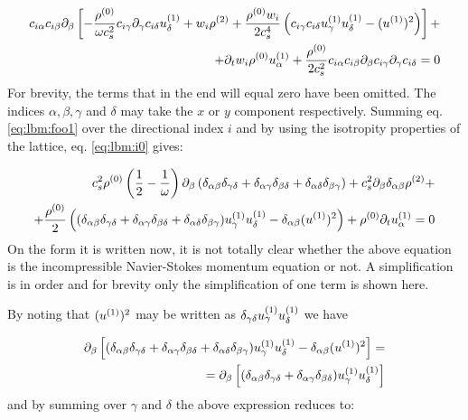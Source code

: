 \begin{equation}\label{eq:lbm:foo1}
\begin{aligned}
c_{i\alpha}c_{i\beta}\partial_{\beta} \left[ - \frac{\rho^{(0)}}{\omega
    c_s^2} c_{i\gamma}\partial_{\gamma}c_{i\delta} u_{\delta}^{(1)} +
  w_i\rho^{(2)} +
  \frac{\rho^{(0)}w_i}{2c_s^4}\left(c_{i\gamma}c_{i\delta}u_{\gamma}^{(1)}u_{\delta}^{(1)}
  - (u_{}^{(1)})^2 \right) \right] + \\ + \partial_tw_i\rho^{(0)}u_{\alpha}^{(1)} +
\frac{\rho^{(0)}}{2 c_s^2}
c_{i\alpha}c_{i\beta}\partial_{\beta}c_{i\gamma}\partial_{\gamma}c_{i\delta}
= 0
\end{aligned}
\end{equation}
For brevity, the terms that in the end will equal zero have been
omitted. The indices $\alpha, \beta, \gamma$ and $\delta$ may take the
$x$ or $y$ component respectively. Summing eq. \eqref{eq:lbm:foo1}
over the directional index $i$ and by using the isotropity properties
of the lattice, eq. \eqref{eq:lbm:i0} gives:

\begin{equation}\label{eq:lbm:dino}
\begin{aligned}
c_s^2\rho^{(0)}\left( \frac{1}{2} - \frac{1}{\omega}
\right)\partial_{\beta} \left( \delta_{\alpha\beta}\delta_{\gamma\delta}+ \delta_{\alpha\gamma}\delta_{\beta\delta} +\delta_{\alpha\delta}\delta_{\beta\gamma} \right) + c_s^2\partial_{\beta}\delta_{\alpha\beta}
\rho^{(2)} +\\ + \frac{\rho^{(0)}}{2}\left(( \delta_{\alpha\beta}\delta_{\gamma\delta}+ \delta_{\alpha\gamma}\delta_{\beta\delta} +\delta_{\alpha\delta}\delta_{\beta\gamma}) u_{\gamma}^{(1)}u_{\delta}^{(1)} -
\delta_{\alpha\beta}(u_{}^{(1)})^2 \right) + \rho^{(0)}\partial_t u_{\alpha}^{(1)} = 0
\end{aligned}
\end{equation}
On the form it is written now, it is not totally clear whether the
above equation is the incompressible Navier-Stokes momentum equation
or not. A simplification is in order and for brevity only the
simplification of one term is shown here.

By noting that $(u_{}^{(1)})^2$ may be written as
$\delta_{\gamma\delta}u_{\gamma}^{(1)}u_{\delta}^{(1)}$ we have

\begin{equation}
\begin{aligned}
 \partial_{\beta}\left[ (\delta_{\alpha\beta}\delta_{\gamma\delta}+ \delta_{\alpha\gamma}\delta_{\beta\delta} +\delta_{\alpha\delta}\delta_{\beta\gamma}) u_{\gamma}^{(1)}u_{\delta}^{(1)} - \delta_{\alpha\beta}(u_{}^{(1)})^2\right] =
  \\ =\partial_{\beta}\left[(\delta_{\alpha\beta}\delta_{\gamma\delta}+
  \delta_{\alpha\gamma}\delta_{\beta\delta})u_{\gamma}^{(1)}u_{\delta}^{(1)}\right]
\end{aligned}
\end{equation}
and by summing over $\gamma$ and $\delta$ the above expression reduces
to:

